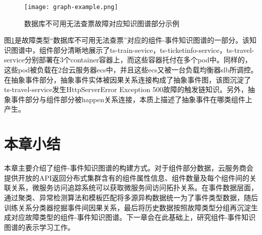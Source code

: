 \begin{figure}[htbp]
    \centering
    \texttt{[image: graph-example.png]}
    \caption{数据库不可用无法查票故障对应知识图谱部分示例\label{graph-example}}
\end{figure}

图\ref{graph-example}是故障类型“数据库不可用无法查票”对应的组件-事件知识图谱的一部分。该知识图谱中，组件部分清晰地展示了ts-train-sevice，ts-ticketinfo-service，ts-travel-service分别部署在3个container容器上，而这些容器托付在多个pod中。同样的，这些pod被负载在2台云服务器ecs中，并且这些ecs又被一台负载均衡器slb所调控。在抽象事件部分，抽象事件实体被因果关系连接构成了抽象事件图，该图沉淀了ts-travel-service发生HttpServerError Exception 500故障的触发链知识。另外，抽象事件部分与组件部分被happen关系连接，本质上描述了抽象事件在哪类组件上产生。

\section{本章小结}
本章主要介绍了组件-事件知识图谱的构建方式。对于组件部分数据，云服务商会提供开放的API返回分布式集群含有的组件属性信息、组件数量及每个组件间的关联关系，微服务访问追踪系统可以获取微服务间访问拓扑关系。在事件数据层面，通过聚类、异常检测算法和模板匹配将多源异构数据统一为了事件类型数据，随后训练关系分类器挖掘事件间因果关系，最后将历史数据按照故障类型分组再沉淀生成对应故障类型的组件-事件知识图谱。下一章会在此基础上，研究组件-事件知识图谱的表示学习工作。


